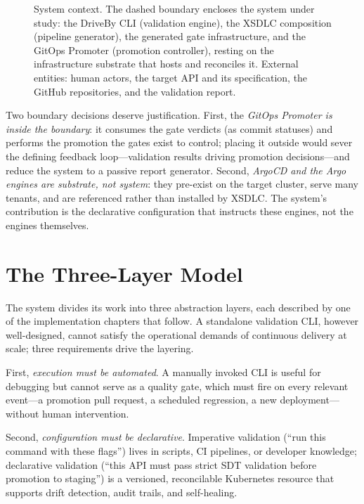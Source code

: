 \begin{figure}[htbp]
\centering
\resizebox{\textwidth}{!}{%
%
}
\caption{System context. The dashed boundary encloses the system under study: the DriveBy CLI (validation engine), the XSDLC composition (pipeline generator), the generated gate infrastructure, and the GitOps Promoter (promotion controller), resting on the infrastructure substrate that hosts and reconciles it. External entities: human actors, the target API and its specification, the GitHub repositories, and the validation report.}
\label{fig:system-context}
\end{figure}

Two boundary decisions deserve justification. First, the \textit{GitOps Promoter is inside the boundary}: it consumes the gate verdicts (as commit statuses) and performs the promotion the gates exist to control; placing it outside would sever the defining feedback loop---validation results driving promotion decisions---and reduce the system to a passive report generator. Second, \textit{ArgoCD and the Argo engines are substrate, not system}: they pre-exist on the target cluster, serve many tenants, and are referenced rather than installed by XSDLC. The system's contribution is the declarative configuration that instructs these engines, not the engines themselves.

\section{The Three-Layer Model}
\label{sec:three-layer-model}

The system divides its work into three abstraction layers, each described by one of the implementation chapters that follow. A standalone validation CLI, however well-designed, cannot satisfy the operational demands of continuous delivery at scale; three requirements drive the layering.

First, \textit{execution must be automated}. A manually invoked CLI is useful for debugging but cannot serve as a quality gate, which must fire on every relevant event---a promotion pull request, a scheduled regression, a new deployment---without human intervention.

Second, \textit{configuration must be declarative}. Imperative validation (``run this command with these flags'') lives in scripts, CI pipelines, or developer knowledge; declarative validation (``this API must pass strict SDT validation before promotion to staging'') is a versioned, reconcilable Kubernetes resource that supports drift detection, audit trails, and self-healing.

